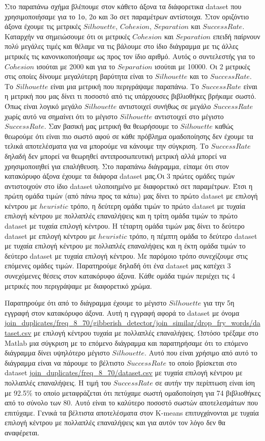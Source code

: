 Στο παραπάνω σχήμα βλέπουμε στον κάθετο άξονα τα διάφορετικα dataset που χρησιμοποιήσαμε για το 1ο, 2ο και 3ο σετ παραμέτρων αντίστοιχα. Στον οριζόντιο άξονα έχουμε τις μετρικές $Silhouette$, $Cohesion$, $Separation$ και $Success Rate$. Καταρχήν να σημειώσουμε ότι οι μετρικές $Cohesion$ και $Separation$ επειδή παίρνουν πολύ μεγάλες τιμές και θέλαμε να τις βάλουμε στο ίδιο διάγραμμα με τις άλλες μετρικές τις κανονικοποιήσαμε ως προς τον ίδιο αριθμό. Αυτός ο συντελεστής για το $Cohesion$ ισούται με 2000 και για το $Separation$ ισούται με 10000. 
Οι 2 μετρικές στις οποίες δίνουμε μεγαλύτερη βαρύτητα είναι το $Silhouette$ και το $Success Rate$. Το $Silhouette$ είναι μια μετρική που περιγράψαμε παραπάνω. Το $Success Rate$ είναι η μετρική που μας δίνει τι ποσοστό από τις υπάρχουσες βιβλιοθήκες βρήκαμε σωστό. Όπως είναι λογικό μεγάλο $Silhouette$ αντιστοιχεί συνήθως σε μεγάλο $Success Rate$ χωρίς αυτό να σημαίνει ότι το μέγιστο $Silhouette$ αντιστοιχεί στο μέγιστο $Success Rate$. Σαν βασική μας μετρική θα θεωρήσουμε το $Silhouette$ καθώς θεωρούμε ότι είναι πιο σωστό αφού σε κάθε πρόβλημα ομαδοποίησης δεν έχουμε τα τελικά αποτελέσματα για να μπορούμε να κάνουμε την σύγκριση. Το $Success Rate$ δηλαδή δεν μπορεί να θεωρηθεί αντιπροσωπευτική μετρική αλλά μπορεί να χρησιμοποιηθεί για επαλήθευση. 
Στο παραπάνω διάγραμμα, είπαμε ότι στον κατακόρυφο άξονα έχουμε τα διάφορα dataset μας.Οι 3 πρώτες ομάδες τιμών αντιστοιχούν στο ίδιο dataset υλοποιημένο με διαφορετικό σετ παραμέτρων. Έτσι η πρώτη ομάδα τιμών (από πάνω προς τα κάτω) μας δίνει το πρώτο dataset με επιλογή κέντρου με $heuristic$ τρόπο, η δεύτερη ομάδα τιμών το πρώτο dataset με τυχαία επιλογή κέντρου με πολλαπλές επαναλήψεις και η τρίτη ομάδα τιμών το πρώτο dataset με τυχαία επιλογή κέντρου. Η τέταρτη ομάδα τιμών μας δίνει το δεύτερο dataset με επιλογή κέντρου με $heuristic$ τρόπο, η πέμπτη ομάδα το δεύτερο dataset  με τυχαία επιλογή κέντρου με πολλαπλές επαναλήψεις και η έκτη ομάδα τιμών το δεύτερο dataset με τυχαία επιλογή κέντρου. Με παρόμοιο τρόπο συνεχίζουμε στις επόμενες ομάδες τιμών. Παρατηρούμε δηλαδή ότι ένα dataset μας κατέχει 3 συνεχόμενες θέσεις στον κατακόρυφο άξονα.
Κάθε ομάδα τιμών περιέχει τις 4 μετρικές που περιγράψαμε με διαφορετικό χρώμα.

Παρατηρούμε ότι από το διάγραμμα έχουμε το μέγιστο $Silhouette$ για την 5η εγγραφή στον κατακόρυφο άξονα. Αυτή η εγγραφή αφορά το dataset με όνομα \url{join_duplicates/freq_8_70/gibberish_detector/join_similar/drop_fry_words/dataset.csv} με επιλογή κέντρου τυχαία με πολλαπλές επαναλήψεις. Ωστόσο τρέξαμε στο Matlab μια σύγκριση με το επόμενο διάγραμμα και παρατηρήσαμε ότι το επόμενο διάγραμμα δίνει υψηλότερο μέγιστο $Silhouette$. Αυτό που είναι χρήσιμο από αυτό το διάγραμμα είναι να πάρουμε το βέλτιστο $Success Rate$ το οποίο βρίσκεται στο dataset \url{join_duplicates/freq_8_70/dataset.csv} με τυχαία επιλογή κέντρου με πολλαπλές επαναλήψεις. Η τιμή του $Success Rate$ σε αυτήν την περίπτωση είναι ίση με 92.5\% το οποίο μεταφράζεται ότι πετύχαμε σωστή ομαδοποίηση για 74 βιβλιοθήκες από το σύνολο των 80. Αυτό είναι το καλύτερο ποσοστό σωστών αποτελεσμάτων που επιτύχαμε. Γενικά τα βέλτιστα αποτελέσματα στον K-means επιτυγχάνονται με τυχαία επιλογή κέντρου με πολλαπλές επαναλήψεις και για αυτόν τον λόγο δεν θα αναφέρεται.

